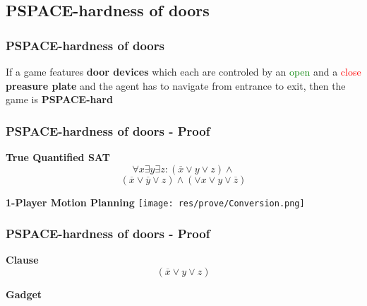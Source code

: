 \documentclass{beamer}
\begin{document}
\subsection{PSPACE-hardness of doors}
\begin{frame}
  \frametitle{PSPACE-hardness of doors}
  \begin{theorem}
    If a game features \textbf{door devices} which each are controled by an
    \textcolor{green}{open} and a \textcolor{red}{close} \textbf{preasure plate}
    and the agent has to navigate from entrance to exit, then the game is
    \textbf{PSPACE-hard}
  \end{theorem}
\end{frame}
\begin{frame}
  \frametitle{PSPACE-hardness of doors - Proof}
  \begin{minipage}[t]{0.48\textwidth}
    \textbf{True Quantified SAT}
    \[ \forall x \exists y \exists z :  (\overline{x} \lor y \lor z) \land \]
    \[ (\overline{x} \lor \overline{y} \lor z) \land (\lor x \lor y \lor \overline{z}) \]
  \end{minipage}
  \begin{minipage}[t]{0.48\textwidth}
    \textbf{1-Player Motion Planning}
    \texttt{[image: res/prove/Conversion.png]}
  \end{minipage}
\end{frame}

\begin{frame}
  \frametitle{PSPACE-hardness of doors - Proof}
  \begin{minipage}[t]{0.45\textwidth}
    \textbf{Clause}
    \[ (\overline{x} \lor y \lor z) \]
  \end{minipage}
  \begin{minipage}[t]{0.45\textwidth}
    \textbf{Gadget}\\
  \end{minipage}
\end{frame}
\end{document}
